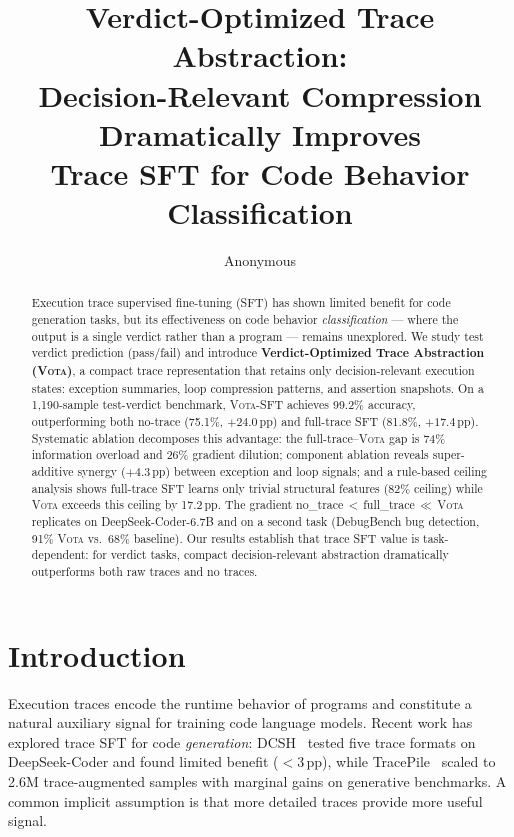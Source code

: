 \documentclass[11pt,a4paper]{article}
\title{Verdict-Optimized Trace Abstraction: \\
Decision-Relevant Compression Dramatically Improves \\
Trace SFT for Code Behavior Classification}
\author{Anonymous}
\newcommand{\vota}{\textsc{Vota}}
\newcommand{\pp}{\,\text{pp}}
\begin{document}
\maketitle

\begin{abstract}
Execution trace supervised fine-tuning (SFT) has shown limited benefit for code generation tasks, but its effectiveness on code behavior \emph{classification} --- where the output is a single verdict rather than a program --- remains unexplored.
We study test verdict prediction (pass/fail) and introduce \textbf{Verdict-Optimized Trace Abstraction (\vota{})}, a compact trace representation that retains only decision-relevant execution states: exception summaries, loop compression patterns, and assertion snapshots.
On a 1{,}190-sample test-verdict benchmark, \vota{}-SFT achieves 99.2\% accuracy, outperforming both no-trace (75.1\%, $+24.0\pp$) and full-trace SFT (81.8\%, $+17.4\pp$).
Systematic ablation decomposes this advantage: the full-trace--\vota{} gap is 74\% information overload and 26\% gradient dilution; component ablation reveals super-additive synergy ($+4.3\pp$) between exception and loop signals; and a rule-based ceiling analysis shows full-trace SFT learns only trivial structural features (82\% ceiling) while \vota{} exceeds this ceiling by 17.2$\pp$.
The gradient \mbox{no\_trace\,$<$\,full\_trace\,$\ll$\,\vota{}} replicates on DeepSeek-Coder-6.7B and on a second task (DebugBench bug detection, 91\% \vota{} vs.\ 68\% baseline).
Our results establish that trace SFT value is task-dependent: for verdict tasks, compact decision-relevant abstraction dramatically outperforms both raw traces and no traces.
\end{abstract}

\section{Introduction}
\label{sec:intro}

Execution traces encode the runtime behavior of programs and constitute a natural auxiliary signal for training code language models.
Recent work has explored trace SFT for code \emph{generation}: DCSH~\cite{dcsh2025} tested five trace formats on DeepSeek-Coder and found limited benefit ($<$3\,pp), while TracePile~\cite{tracepile2025} scaled to 2.6M trace-augmented samples with marginal gains on generative benchmarks.
A common implicit assumption is that more detailed traces provide more useful signal.
\end{document}
